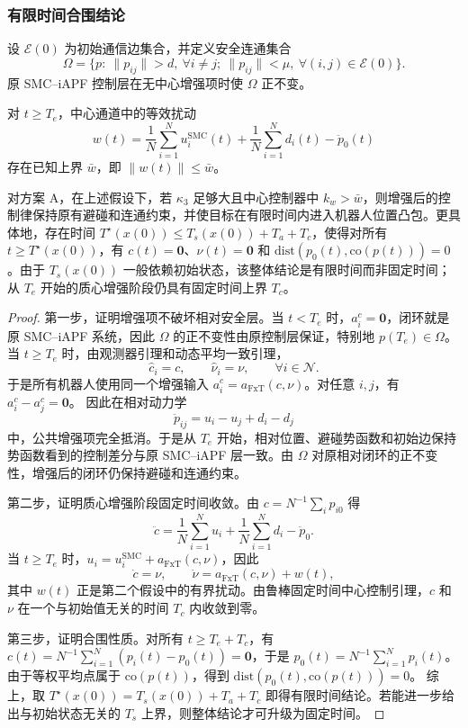 \subsubsection{有限时间合围结论}

\begin{assumption}
设 $\mathcal{E}(0)$ 为初始通信边集合，并定义安全连通集合
$$
\Omega=\{p:\ \|p_{ij}\|>d,\ \forall i\neq j;\ \|p_{ij}\|<\mu,\ \forall (i,j)\in\mathcal{E}(0)\}.
$$
原 SMC--iAPF 控制层在无中心增强项时使 $\Omega$ 正不变。
\end{assumption}

\begin{assumption}
对 $t\geq T_e$，中心通道中的等效扰动
$$
w(t)=
\frac{1}{N}\sum_{i=1}^{N}u_i^{\mathrm{SMC}}(t)
+\frac{1}{N}\sum_{i=1}^{N}d_i(t)
-\ddot p_0(t)
$$
存在已知上界 $\bar w$，即 $\|w(t)\|\leq\bar w$。
\end{assumption}

\begin{theorem}
对方案 A，在上述假设下，若 $\kappa_3$ 足够大且中心控制器中 $k_w>\bar w$，则增强后的控制律保持原有避碰和连通约束，并使目标在有限时间内进入机器人位置凸包。更具体地，存在时间 $T^\star(x(0))\leq T_s(x(0))+T_a+T_c$，使得对所有 $t\geq T^\star(x(0))$，有 $c(t)=\mathbf{0}$、$\nu(t)=\mathbf{0}$ 和 $\mathrm{dist}(p_0(t),\mathrm{co}(p(t)))=0$。由于 $T_s(x(0))$ 一般依赖初始状态，该整体结论是有限时间而非固定时间；从 $T_e$ 开始的质心增强阶段仍具有固定时间上界 $T_c$。
\end{theorem}

\begin{proof}
第一步，证明增强项不破坏相对安全层。当 $t<T_e$ 时，$a_i^c=\mathbf{0}$，闭环就是原 SMC--iAPF 系统，因此 $\Omega$ 的正不变性由原控制层保证，特别地 $p(T_e)\in\Omega$。当 $t\geq T_e$ 时，由观测器引理和动态平均一致引理，
$$
\hat c_i=c,\qquad \hat\nu_i=\nu,\qquad \forall i\in\mathcal{N}.
$$
于是所有机器人使用同一个增强输入 $a_i^c=a_{\mathrm{FxT}}(c,\nu)$。对任意 $i,j$，有 $a_i^c-a_j^c=\mathbf{0}$。
因此在相对动力学
$$
\ddot p_{ij}
=u_i-u_j+d_i-d_j
$$
中，公共增强项完全抵消。于是从 $T_e$ 开始，相对位置、避碰势函数和初始边保持势函数看到的控制差分与原 SMC--iAPF 层一致。由 $\Omega$ 对原相对闭环的正不变性，增强后的闭环仍保持避碰和连通约束。

第二步，证明质心增强阶段固定时间收敛。由 $c=N^{-1}\sum_i p_{i0}$ 得
$$
\ddot c
=\frac{1}{N}\sum_{i=1}^{N}u_i
+\frac{1}{N}\sum_{i=1}^{N}d_i-\ddot p_0 .
$$
当 $t\geq T_e$ 时，$u_i=u_i^{\mathrm{SMC}}+a_{\mathrm{FxT}}(c,\nu)$，因此
$$
\dot c=\nu,\qquad
\dot\nu=a_{\mathrm{FxT}}(c,\nu)+w(t),
$$
其中 $w(t)$ 正是第二个假设中的有界扰动。由鲁棒固定时间中心控制引理，$c$ 和 $\nu$ 在一个与初始值无关的时间 $T_c$ 内收敛到零。

第三步，证明合围性质。对所有 $t\geq T_e+T_c$，有 $c(t)=N^{-1}\sum_{i=1}^{N}(p_i(t)-p_0(t))=\mathbf{0}$，于是 $p_0(t)=N^{-1}\sum_{i=1}^{N}p_i(t)$。由于等权平均点属于 $\mathrm{co}(p(t))$，得到 $\mathrm{dist}(p_0(t),\mathrm{co}(p(t)))=0$。
综上，取 $T^\star(x(0))=T_s(x(0))+T_a+T_c$ 即得有限时间结论。若能进一步给出与初始状态无关的 $T_s$ 上界，则整体结论才可升级为固定时间。
\end{proof}

